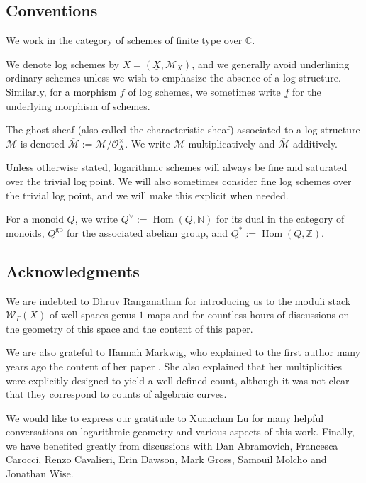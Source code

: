 \documentclass{article}
\def\cM{{\overline{\mathcal{M}}}}
\def\oM{\overline{\mathcal{M}}}
\def\cM{{\mathcal{M}}}
\def\C{\mathbb{C}}
\begin{document}
\subsection{Conventions}

We work in the category of schemes of finite type over $\C$. 

We denote log schemes by $X = (\underline{X}, \mathcal{M}_X)$, and we generally avoid underlining ordinary schemes unless we wish to emphasize the absence of a log structure. Similarly, for a morphism $f$ of log schemes, we sometimes write $\underline{f}$ for the underlying morphism of schemes.

The ghost sheaf (also called the characteristic sheaf) associated to a log structure $\cM$ is denoted
$
\oM := \cM / \mathcal{O}_X^{\times}.
$
We write $\cM$ multiplicatively and $\oM$ additively.

Unless otherwise stated, logarithmic schemes will always be fine and saturated over the trivial log point.
We will also sometimes consider fine log schemes over the trivial log point, and we will make this explicit when needed.

For a monoid $Q$, we write
$
Q^{\vee} := \operatorname{Hom}(Q, \mathbb{N})
$
for its dual in the category of monoids, $Q^{\mathrm{gp}}$ for the associated abelian group, and
$
Q^{*} := \operatorname{Hom}(Q, \mathbb{Z}).
$


\subsection*{Acknowledgments}

We are indebted to Dhruv Ranganathan for introducing us to the moduli stack $\mathcal{W}_{\Gamma}(X)$ of well-spaces genus $1$ maps and for countless hours of discussions on the geometry of this space and the content of this paper.

We are also grateful to Hannah Markwig, who explained to the first author many years ago the content of her paper \cite{KM09}. She also explained that her multiplicities were explicitly designed to yield a well-defined count, although it was not clear that they correspond to counts of algebraic curves. %

We would like to express our gratitude to Xuanchun Lu for many helpful conversations on logarithmic geometry and various aspects of this work. 
Finally, we have benefited greatly from discussions with Dan Abramovich, Francesca Carocci, Renzo Cavalieri, Erin Dawson, Mark Gross, Samouil Molcho and Jonathan Wise. 
\end{document}

